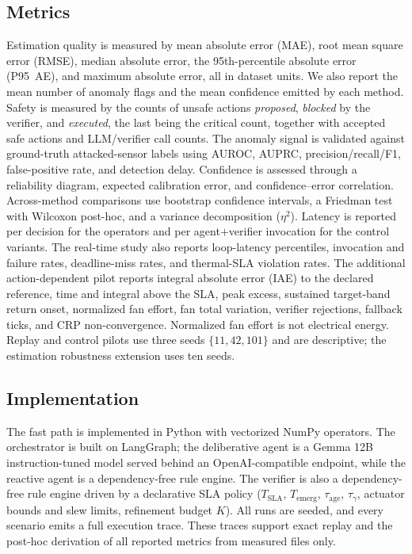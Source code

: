 \documentclass[smartcities,article,submit,moreauthors]{Definitions/mdpi}
\begin{document}
\subsection{Metrics}
\label{sec:setup_metrics}

Estimation quality is measured by mean absolute error (MAE), root mean
square error (RMSE), median absolute error, the 95th-percentile absolute
error (P95~AE), and maximum absolute error, all in dataset units. We also
report the mean number of anomaly flags and the mean confidence emitted
by each method. Safety is measured by the counts of unsafe actions
\emph{proposed}, \emph{blocked} by the verifier, and \emph{executed}, the
last being the critical count, together with accepted safe actions and
LLM/verifier call counts. The anomaly signal is validated against
ground-truth attacked-sensor labels using AUROC, AUPRC,
precision/recall/F1, false-positive rate, and detection delay. Confidence
is assessed through a reliability diagram, expected calibration error,
and confidence--error correlation. Across-method comparisons use
bootstrap confidence intervals, a Friedman test with Wilcoxon post-hoc,
and a variance decomposition ($\eta^2$). Latency is reported per decision
for the operators and per agent$+$verifier invocation for the control
variants. The real-time study also reports loop-latency
percentiles, invocation and failure rates, deadline-miss rates, and
thermal-SLA violation rates. The additional action-dependent pilot reports
integral absolute error (IAE) to the declared reference, time and integral
above the SLA, peak excess, sustained target-band return onset, normalized fan
effort, fan total variation, verifier rejections, fallback ticks, and CRP
non-convergence. Normalized fan effort is not electrical energy. Replay and
control pilots use three seeds $\{11,42,101\}$ and are descriptive; the
estimation robustness extension uses ten seeds.

\subsection{Implementation}
\label{sec:setup_impl}

The fast path is implemented in Python with vectorized NumPy operators.
The orchestrator is built on LangGraph; the deliberative agent is a
Gemma 12B instruction-tuned model served behind an OpenAI-compatible
endpoint, while the reactive agent is a dependency-free rule engine. The
verifier is also a dependency-free rule engine driven by a declarative
SLA policy ($T_{\mathrm{SLA}}$, $T_{\mathrm{emerg}}$,
$\tau_{\mathrm{age}}$, $\tau_{\gamma}$, actuator bounds and slew limits,
refinement budget $K$). All runs are seeded, and every scenario emits a
full execution trace. These traces support exact replay and the post-hoc
derivation of all reported metrics from measured files only.
\end{document}
